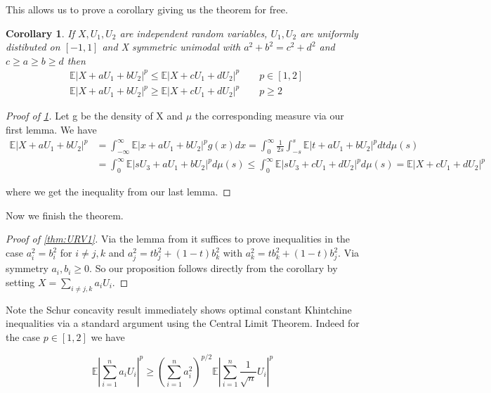 \documentclass[10pt]{article}
\newcommand{\E}{\mathbb{E}}
\newcommand{\1}{\textbf{1}}
\newcommand{\normOne}[1]{\left\lvert#1\right\rvert}
\newcommand{\lparen}{\left(}
\newcommand{\rparen}{\right)}
\newtheorem{corollary}{Corollary}[subsection]
\theoremstyle{remark}
\theoremstyle{definition}
\begin{document}
This allows us to prove a corollary giving us the theorem for free.

\begin{corollary}\label{cor:URV1}
	If $X,U_1,U_2$ are independent random variables, $U_1,U_2$ are uniformly distibuted on $[-1,1]$ and X symmetric unimodal with $a^2+b^2 = c^2+d^2$ and $c \geq a \geq b \geq d$ then
	\begin{align*}
		&\E|X + aU_1 + bU_2|^p \leq \E |X+cU_1 + dU_2|^p \qquad p \in [1,2]\\
		&\E|X + aU_1 + bU_2|^p \geq \E |X+cU_1 + dU_2|^p \qquad p \geq 2
	\end{align*}
\end{corollary}

\begin{proof}[Proof of \ref{cor:URV1}]
	Let g be the density of X and $\mu$ the corresponding measure via our first lemma. We have
	\begin{align*}
		\E|X + aU_1 + bU_2|^p &= \int_{-\infty}^{\infty}\E|x+aU_1 + bU_2|^p g(x)dx = \int_0^{\infty}\frac{1}{2s}\int_{-s}^s \E|t+aU_1 + bU_2|^p dt d\mu(s)\\
		&= \int_0^{\infty} \E|sU_3 + aU_1 + bU_2|^p d\mu(s) \leq \int_0^{\infty} \E|sU_3 + cU_1 +d U_2|^p d\mu(s) = \E |X + cU_1 + dU_2|^p
	\end{align*}

	where we get the inequality from our last lemma.
\end{proof}

Now we finish the theorem.

\begin{proof}[Proof of \ref{thm:URV1}]

	Via the lemma from \cite{MO} it suffices to prove inequalities in the case $a_i^2 = b_i^2$ for $i \neq j,k$ and $a_j^2 = tb_j^2 + (1-t)b_k^2$ with $a_k^2 = tb_k^2+(1-t)b_j^2$. Via symmetry $ a_i,b_i \geq 0$. So our proposition follows directly from the corollary by setting $X = \sum_{i \neq j,k} a_iU_i$. 
\end{proof}

Note the Schur concavity result immediately shows optimal constant Khintchine inequalities via a standard argument using the Central Limit Theorem. Indeed for the case $p \in [1,2]$ we have

\begin{equation*}
	\E \normOne{\sum_{i=1}^n a_iU_i}^p \geq \lparen\sum_{i=1}^na_i^2\rparen^{p/2}\E\normOne{\sum_{i=1}^n \frac{1}{\sqrt{n}}U_i}^p
\end{equation*}
\end{document}
